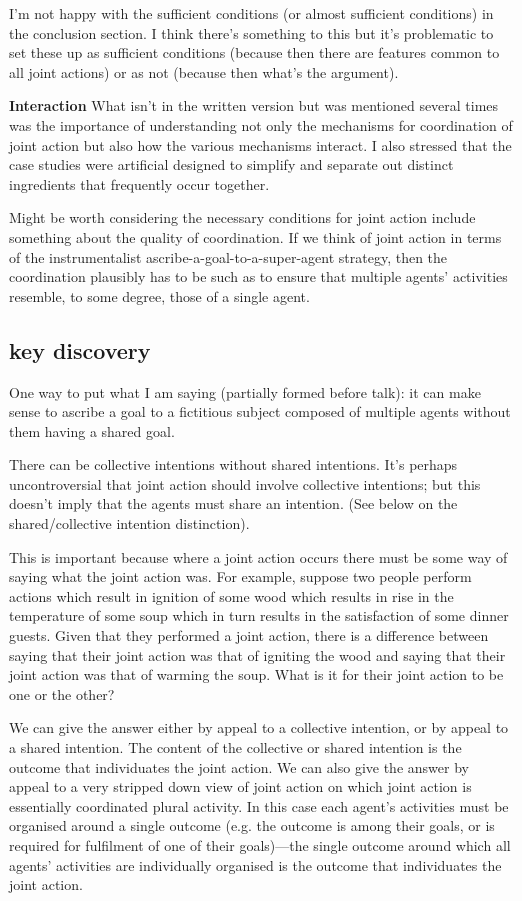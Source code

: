 \documentclass[12pt,a4paper]{extarticle}
\begin{document}
I'm not happy with the sufficient conditions (or almost sufficient conditions) in the conclusion section.  I think there's something to this but it's problematic to set these up as sufficient conditions (because then there are features common to all joint actions) or as not (because then what's the argument).

\textbf{Interaction}  What isn't in the written version but was mentioned several times was the importance of understanding not only the mechanisms for coordination of joint action but also how the various mechanisms interact.  I also stressed that the case studies were artificial designed to simplify and separate out distinct ingredients that frequently occur together.

Might be worth considering the necessary conditions for joint action include something about the quality of coordination.  If we think of joint action in terms of the instrumentalist ascribe-a-goal-to-a-super-agent strategy, then the coordination plausibly has to be such as to ensure that multiple agents' activities resemble, to some degree, those of a single agent.

\subsection{key discovery}
One way to put what I am saying (partially formed before talk): it can make sense to ascribe a goal to a fictitious subject composed of multiple agents without them having a shared goal.

There can be collective intentions without shared intentions.  It's perhaps uncontroversial that joint action should involve collective intentions; but this doesn't imply that the agents must share an intention.  (See below on the shared/collective intention distinction).

This is important because where a joint action occurs there must be some way of saying what the joint action was.  For example, suppose two people perform actions which result in ignition of some wood which results in rise in the temperature of some soup which in turn results in the satisfaction of some dinner guests.  Given that they performed a joint action, there is a difference between saying that their joint action was that of igniting the wood and saying that their joint action was that of warming the soup.  What is it for their joint action to be one or the other?

We can give the answer either by appeal to a collective intention, or by appeal to a shared intention.  The content of the collective or shared intention is the outcome that individuates the joint action.  We can also give the answer by appeal to a very stripped down view of joint action on which joint action is essentially coordinated plural activity.  In this case each agent's activities must be organised around a single outcome (e.g. the outcome is among their goals, or is required for fulfilment of one of their goals)---the single outcome around which all agents' activities are individually organised is the outcome that individuates the joint action.
\end{document}
